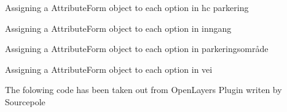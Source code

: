 \documentclass[letterpaper,10pt,english]{sphinxmanual}
\begin{document}
\begin{fulllineitems}

\begin{fulllineitems}
\label{\detokenize{code:Tilgjengelighet.Tilgjengelighet.assign_combobox_hc_parkering}}
Assigning a AttributeForm object to each option in hc parkering

\end{fulllineitems}


\begin{fulllineitems}
\label{\detokenize{code:Tilgjengelighet.Tilgjengelighet.assign_combobox_inngang}}
Assigning a AttributeForm object to each option in inngang

\end{fulllineitems}


\begin{fulllineitems}
\label{\detokenize{code:Tilgjengelighet.Tilgjengelighet.assign_combobox_parkeringsomraade}}
Assigning a AttributeForm object to each option in parkeringsområde

\end{fulllineitems}


\begin{fulllineitems}
\label{\detokenize{code:Tilgjengelighet.Tilgjengelighet.assign_combobox_vei}}
Assigning a AttributeForm object to each option in vei

\end{fulllineitems}


\begin{fulllineitems}
\label{\detokenize{code:Tilgjengelighet.Tilgjengelighet.canvasCrs}}
The folowing code has been taken out from OpenLayers Plugin writen by Sourcepole


\end{fulllineitems}
\end{fulllineitems}
\end{document}

